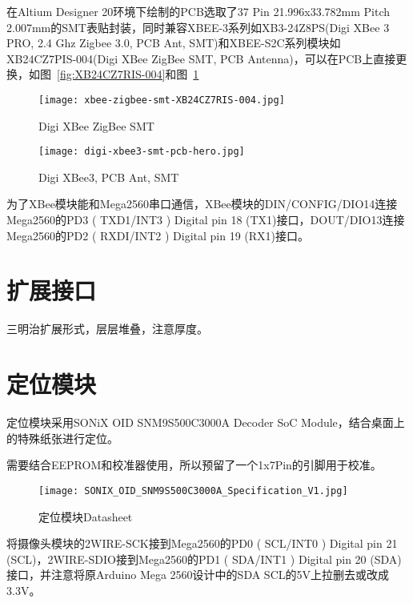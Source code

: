 在Altium Designer 20环境下绘制的PCB选取了37 Pin 21.996x33.782mm Pitch 2.007mm的SMT表贴封装，同时兼容XBEE-3系列如XB3-24Z8PS(Digi XBee 3 PRO, 2.4 Ghz Zigbee 3.0, PCB Ant, SMT)和XBEE-S2C系列模块如XB24CZ7PIS-004(Digi XBee ZigBee SMT, PCB Antenna)，可以在PCB上直接更换，如图~\ref{fig:XB24CZ7RIS-004}和图~\ref{fig:xbee3}

\begin{figure}
    \begin{minipage}{0.48\textwidth}
      \centering
      \texttt{[image: xbee-zigbee-smt-XB24CZ7RIS-004.jpg]}
      \caption{Digi XBee ZigBee SMT}
      \label{fig:XB24CZ7RIS-004}
    \end{minipage}\hfill
    \begin{minipage}{0.48\textwidth}
      \centering
      \texttt{[image: digi-xbee3-smt-pcb-hero.jpg]}
      \caption{Digi XBee3, PCB Ant, SMT}
      \label{fig:xbee3}
    \end{minipage}
\end{figure}

为了XBee模块能和Mega2560串口通信，XBee模块的DIN/CONFIG/DIO14连接Mega2560的PD3 ( TXD1/INT3 ) Digital pin 18 (TX1)接口，DOUT/DIO13连接Mega2560的PD2 ( RXDI/INT2 ) Digital pin 19 (RX1)接口。

\section{扩展接口}

三明治扩展形式，层层堆叠，注意厚度。

\section{定位模块}

定位模块采用SONiX OID SNM9S500C3000A Decoder SoC Module，结合桌面上的特殊纸张进行定位。

需要结合EEPROM和校准器使用，所以预留了一个1x7Pin的引脚用于校准。

\begin{figure}[htbp]
    \centering
    \texttt{[image: SONIX\_OID\_SNM9S500C3000A\_Specification\_V1.jpg]}
    \caption{定位模块Datasheet}
    \label{fig:Camera}
\end{figure}

将摄像头模块的2WIRE-SCK接到Mega2560的PD0 ( SCL/INT0 ) Digital pin 21 (SCL)，2WIRE-SDIO接到Mega2560的PD1 ( SDA/INT1 ) Digital pin 20 (SDA)接口，并注意将原Arduino Mega 2560设计中的SDA SCL的5V上拉删去或改成3.3V。

